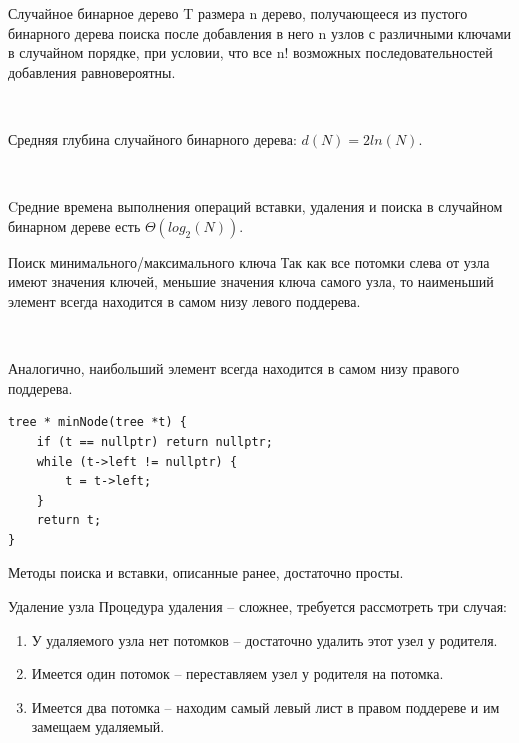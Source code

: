 \documentclass{beamer}
\begin{document}
\begin{frame}
	\begin{block}{Случайное бинарное дерево T размера n}
		 дерево, получающееся из пустого бинарного дерева поиска после добавления в него n узлов с различными ключами в случайном порядке, при условии, что все n! возможных последовательностей добавления равновероятны. 
	\end{block}	

	~	
	
	Средняя глубина случайного бинарного дерева: $d(N)=2 ln(N)$.

	~
	
	Cредние времена выполнения операций вставки, удаления и поиска в случайном бинарном дереве есть $\Theta(log_2(N))$.
\end{frame}

\begin{frame}[fragile]{Поиск минимального/максимального ключа}
	Так как все потомки слева от узла имеют значения ключей, меньшие значения ключа самого узла, то наименьший элемент всегда находится в самом низу левого поддерева. 

	~	
	
	Аналогично, наибольший элемент всегда находится в самом низу правого поддерева.
	
	\begin{verbatim}
tree * minNode(tree *t) {
	if (t == nullptr) return nullptr;
	while (t->left != nullptr) {
		t = t->left;
	}
	return t;
}
	\end{verbatim}
	Методы поиска и вставки, описанные ранее, достаточно просты.
\end{frame}

\begin{frame}[fragile]{Удаление узла}
	Процедура удаления -- сложнее, требуется рассмотреть три случая:
	\begin{enumerate}
		\item У удаляемого узла нет потомков -- достаточно удалить этот узел у родителя.
		\item Имеется один потомок -- переставляем узел у родителя на потомка.
		\item Имеется два потомка -- находим самый левый лист в правом поддереве и им замещаем удаляемый.
	\end{enumerate}
\end{frame}
\end{document}
